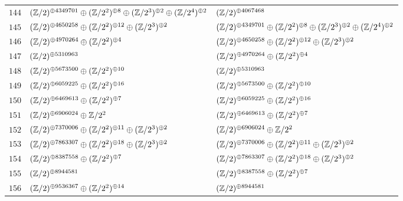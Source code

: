 \begin{supertabular}{|c|p{5.5cm}|p{5.5cm}|}
$144$%
&$(\mathbb{Z}/2)^{\oplus4349701}\oplus(\mathbb{Z}/2^{2})^{\oplus8}\oplus(\mathbb{Z}/2^{3})^{\oplus2}\oplus(\mathbb{Z}/2^{4})^{\oplus2}$%
&$(\mathbb{Z}/2)^{\oplus4067468}$\\

$145$%
&$(\mathbb{Z}/2)^{\oplus4650258}\oplus(\mathbb{Z}/2^{2})^{\oplus12}\oplus(\mathbb{Z}/2^{3})^{\oplus2}$%
&$(\mathbb{Z}/2)^{\oplus4349701}\oplus(\mathbb{Z}/2^{2})^{\oplus8}\oplus(\mathbb{Z}/2^{3})^{\oplus2}\oplus(\mathbb{Z}/2^{4})^{\oplus2}$\\

$146$%
&$(\mathbb{Z}/2)^{\oplus4970264}\oplus(\mathbb{Z}/2^{2})^{\oplus4}$%
&$(\mathbb{Z}/2)^{\oplus4650258}\oplus(\mathbb{Z}/2^{2})^{\oplus12}\oplus(\mathbb{Z}/2^{3})^{\oplus2}$\\

$147$%
&$(\mathbb{Z}/2)^{\oplus5310963}$%
&$(\mathbb{Z}/2)^{\oplus4970264}\oplus(\mathbb{Z}/2^{2})^{\oplus4}$\\

$148$%
&$(\mathbb{Z}/2)^{\oplus5673500}\oplus(\mathbb{Z}/2^{2})^{\oplus10}$%
&$(\mathbb{Z}/2)^{\oplus5310963}$\\

$149$%
&$(\mathbb{Z}/2)^{\oplus6059225}\oplus(\mathbb{Z}/2^{2})^{\oplus16}$%
&$(\mathbb{Z}/2)^{\oplus5673500}\oplus(\mathbb{Z}/2^{2})^{\oplus10}$\\

$150$%
&$(\mathbb{Z}/2)^{\oplus6469613}\oplus(\mathbb{Z}/2^{2})^{\oplus7}$%
&$(\mathbb{Z}/2)^{\oplus6059225}\oplus(\mathbb{Z}/2^{2})^{\oplus16}$\\

$151$%
&$(\mathbb{Z}/2)^{\oplus6906024}\oplus\mathbb{Z}/2^{2}$%
&$(\mathbb{Z}/2)^{\oplus6469613}\oplus(\mathbb{Z}/2^{2})^{\oplus7}$\\

$152$%
&$(\mathbb{Z}/2)^{\oplus7370006}\oplus(\mathbb{Z}/2^{2})^{\oplus11}\oplus(\mathbb{Z}/2^{3})^{\oplus2}$%
&$(\mathbb{Z}/2)^{\oplus6906024}\oplus\mathbb{Z}/2^{2}$\\

$153$%
&$(\mathbb{Z}/2)^{\oplus7863307}\oplus(\mathbb{Z}/2^{2})^{\oplus18}\oplus(\mathbb{Z}/2^{3})^{\oplus2}$%
&$(\mathbb{Z}/2)^{\oplus7370006}\oplus(\mathbb{Z}/2^{2})^{\oplus11}\oplus(\mathbb{Z}/2^{3})^{\oplus2}$\\

$154$%
&$(\mathbb{Z}/2)^{\oplus8387558}\oplus(\mathbb{Z}/2^{2})^{\oplus7}$%
&$(\mathbb{Z}/2)^{\oplus7863307}\oplus(\mathbb{Z}/2^{2})^{\oplus18}\oplus(\mathbb{Z}/2^{3})^{\oplus2}$\\

$155$%
&$(\mathbb{Z}/2)^{\oplus8944581}$%
&$(\mathbb{Z}/2)^{\oplus8387558}\oplus(\mathbb{Z}/2^{2})^{\oplus7}$\\

$156$%
&$(\mathbb{Z}/2)^{\oplus9536367}\oplus(\mathbb{Z}/2^{2})^{\oplus14}$%
&$(\mathbb{Z}/2)^{\oplus8944581}$\\


\end{supertabular}
